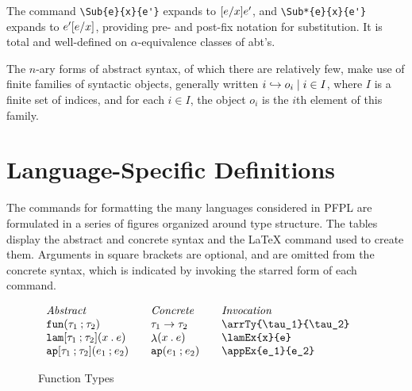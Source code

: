 \documentclass[11pt]{article}
\begin{document}
The command \verb|\Sub{e}{x}{e'}| expands to $\Sub{e}{x}{e'}$, and \verb|\Sub*{e}{x}{e'}| expands to $\Sub*{e}{x}{e'}$, providing pre- and post-fix notation for substitution.  It is total and well-defined on $\alpha$-equivalence classes of abt's.

The $n$-ary forms of abstract syntax, of which there are relatively few, make use of finite families of syntactic objects, generally written $\finmap{I}{i}{o}$, where $I$ is a finite set of indices, and for each $i\in I$, the object $o_i$ is the $i$th element of this family.

\section*{Language-Specific Definitions}

The commands for formatting the many languages considered in \textsf{PFPL} are formulated in a series of figures organized around type structure.  The tables display the abstract and concrete syntax and the \LaTeX{} command used to create them.  Arguments in square brackets are optional, and are omitted from the concrete syntax, which is indicated by invoking the starred form of each command.

\clearpage
{}

\begin{figure}
  \begin{small}
    \begin{displaymath}
      \begin{array}{l@{\qquad}l@{\qquad}l@{\qquad}l}
        \textit{Abstract} & \textit{Concrete} & \textit{Invocation} \\
        \arrTy{\tau_1}{\tau_2} & \arrTy*{\tau_1}{\tau_2} & \verb|\arrTy{\tau_1}{\tau_2}| \\
        \lamEx{x}{e}           & \lamEx*{x}{e}           & \verb|\lamEx{x}{e}|           \\
        \appEx{e_1}{e_2}       & \appEx*{e_1}{e_2}       & \verb|\appEx{e_1}{e_2}|
      \end{array}
    \end{displaymath}
  \end{small}

  \caption{Function Types}
  \label{fig:function}
\end{figure}
\end{document}
